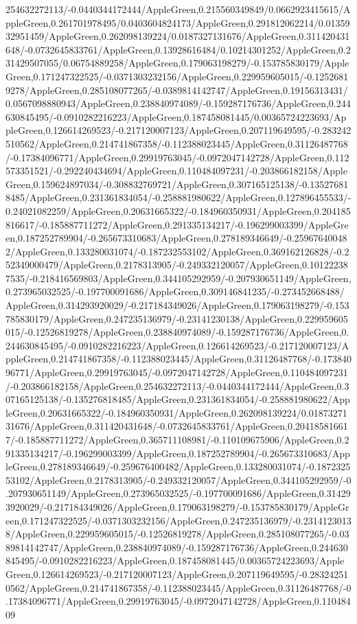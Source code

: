 {\begin{tikzternal}
{254632272113/-0.0440344172444/AppleGreen,0.215560349849/0.0662923415615/AppleGreen,0.261701978495/0.0403604824173/AppleGreen,0.291812062214/0.0135932951459/AppleGreen,0.262098139224/0.0187327131676/AppleGreen,0.311420431648/-0.0732645833761/AppleGreen,0.13928616484/0.10214301252/AppleGreen,0.231429507055/0.06754889258/AppleGreen,0.179063198279/-0.153785830179/AppleGreen,0.171247322525/-0.0371303232156/AppleGreen,0.229959605015/-0.12526819278/AppleGreen,0.285108077265/-0.0389814142747/AppleGreen,0.19156313431/0.0567098880943/AppleGreen,0.238840974089/-0.159287176736/AppleGreen,0.244630845495/-0.0910282216223/AppleGreen,0.187458081445/0.00365724223693/AppleGreen,0.126614269523/-0.217120007123/AppleGreen,0.207119649595/-0.283242510562/AppleGreen,0.214741867358/-0.112388023445/AppleGreen,0.31126487768/-0.17384096771/AppleGreen,0.29919763045/-0.0972047142728/AppleGreen,0.112573351521/-0.292240434694/AppleGreen,0.110484097231/-0.203866182158/AppleGreen,0.159624897034/-0.308832769721/AppleGreen,0.307165125138/-0.135276818485/AppleGreen,0.231361834054/-0.258881980622/AppleGreen,0.127896455533/-0.24021082259/AppleGreen,0.20631665322/-0.184960350931/AppleGreen,0.204185816617/-0.185887711272/AppleGreen,0.291335134217/-0.196299003399/AppleGreen,0.187252789904/-0.265673310683/AppleGreen,0.278189346649/-0.259676400482/AppleGreen,0.133280031074/-0.187232553102/AppleGreen,0.369162126828/-0.252349000479/AppleGreen,0.2178313905/-0.249332120057/AppleGreen,0.101222387535/-0.218416569803/AppleGreen,0.344105292959/-0.207930651149/AppleGreen,0.273965032525/-0.197700091686/AppleGreen,0.309146841235/-0.273452668488/AppleGreen,0.314293920029/-0.217184349026/AppleGreen,0.179063198279/-0.153785830179/AppleGreen,0.247235136979/-0.23141230138/AppleGreen,0.229959605015/-0.12526819278/AppleGreen,0.238840974089/-0.159287176736/AppleGreen,0.244630845495/-0.0910282216223/AppleGreen,0.126614269523/-0.217120007123/AppleGreen,0.214741867358/-0.112388023445/AppleGreen,0.31126487768/-0.17384096771/AppleGreen,0.29919763045/-0.0972047142728/AppleGreen,0.110484097231/-0.203866182158/AppleGreen,0.254632272113/-0.0440344172444/AppleGreen,0.307165125138/-0.135276818485/AppleGreen,0.231361834054/-0.258881980622/AppleGreen,0.20631665322/-0.184960350931/AppleGreen,0.262098139224/0.0187327131676/AppleGreen,0.311420431648/-0.0732645833761/AppleGreen,0.204185816617/-0.185887711272/AppleGreen,0.365711108981/-0.110109675906/AppleGreen,0.291335134217/-0.196299003399/AppleGreen,0.187252789904/-0.265673310683/AppleGreen,0.278189346649/-0.259676400482/AppleGreen,0.133280031074/-0.187232553102/AppleGreen,0.2178313905/-0.249332120057/AppleGreen,0.344105292959/-0.207930651149/AppleGreen,0.273965032525/-0.197700091686/AppleGreen,0.314293920029/-0.217184349026/AppleGreen,0.179063198279/-0.153785830179/AppleGreen,0.171247322525/-0.0371303232156/AppleGreen,0.247235136979/-0.23141230138/AppleGreen,0.229959605015/-0.12526819278/AppleGreen,0.285108077265/-0.0389814142747/AppleGreen,0.238840974089/-0.159287176736/AppleGreen,0.244630845495/-0.0910282216223/AppleGreen,0.187458081445/0.00365724223693/AppleGreen,0.126614269523/-0.217120007123/AppleGreen,0.207119649595/-0.283242510562/AppleGreen,0.214741867358/-0.112388023445/AppleGreen,0.31126487768/-0.17384096771/AppleGreen,0.29919763045/-0.0972047142728/AppleGreen,0.11048409}
\end{tikzternal}}

